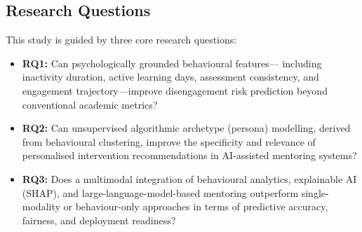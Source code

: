 

\subsection*{Research Questions}
\label{sec:rqs}

This study is guided by three core research questions:

\begin{itemize}[leftmargin=2em]
  \item \textbf{RQ1:} Can psychologically grounded behavioural features—
    including inactivity duration, active learning days, assessment
    consistency, and engagement trajectory—improve disengagement risk
    prediction beyond conventional academic metrics?

  \item \textbf{RQ2:} Can unsupervised algorithmic archetype (persona) modelling, derived from
    behavioural clustering, improve the specificity and relevance of
    personalised intervention recommendations in AI-assisted mentoring
    systems?

  \item \textbf{RQ3:} Does a multimodal integration of behavioural
    analytics, explainable AI (SHAP), and large-language-model-based
    mentoring outperform single-modality or behaviour-only approaches
    in terms of predictive accuracy, fairness, and deployment
    readiness?
\end{itemize}


